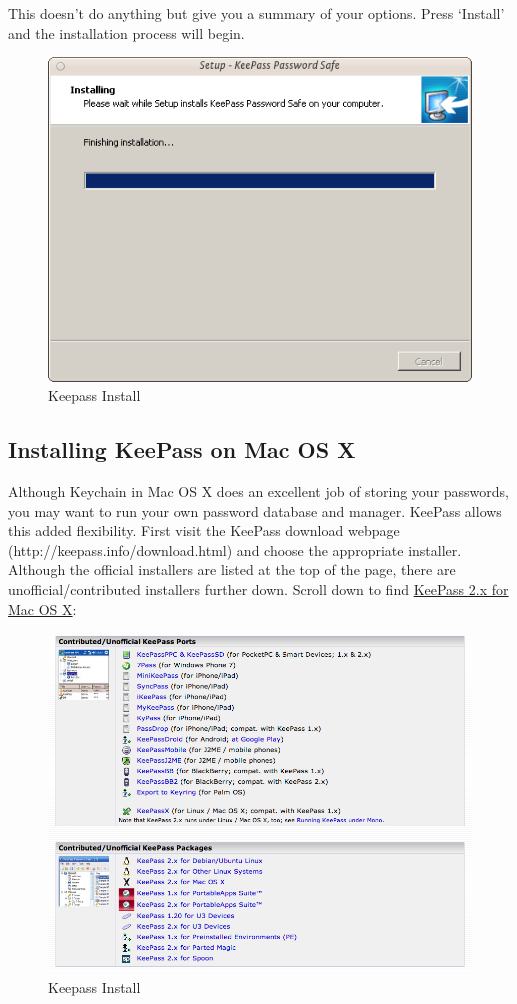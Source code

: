 This doesn't do anything but give you a summary of your options. Press
`Install' and the installation process will begin.

\begin{figure}[htbp]
\centering
\includegraphics{keepass_8.png}
\caption{Keepass Install}
\end{figure}

\subsection{Installing KeePass on Mac OS X}

Although Keychain in Mac OS X does an excellent job of storing your
passwords, you may want to run your own password database and manager.
KeePass allows this added flexibility. First visit the KeePass download
webpage (http://keepass.info/download.html) and choose the appropriate
installer. Although the official installers are listed at the top of the
page, there are unofficial/contributed installers further down. Scroll
down to find \href{http://keepass2.openix.be/}{KeePass 2.x for Mac OS
X}:

\begin{figure}[htbp]
\centering
\includegraphics{keepass_9.png}
\caption{Keepass Install}
\end{figure}


